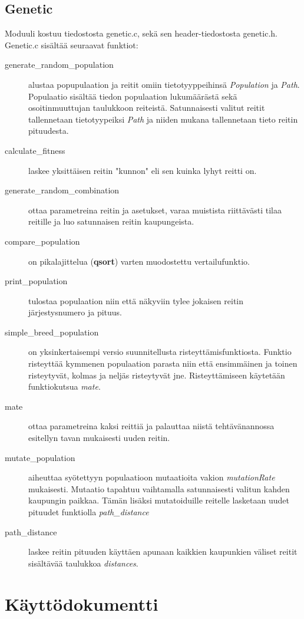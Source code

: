 \documentclass[12pt]{article}
\numberwithin{equation}{section}
\numberwithin{table}{section}
\begin{document}
\subsection{Genetic}
Moduuli kostuu tiedostosta genetic.c, sekä sen header-tiedostosta genetic.h. Genetic.c sisältää seuraavat funktiot:
\begin{description}
\item[generate\_random\_population] alustaa popupulaation ja reitit omiin tietotyyppeihinsä \emph{Population} ja \emph{Path}. Populaatio sisältää tiedon populaation lukumäärästä sekä osoitinmuuttujan taulukkoon reiteistä. Satunnaisesti valitut reitit tallennetaan tietotyypeiksi \emph{Path} ja niiden mukana tallennetaan tieto reitin pituudesta.
\item[calculate\_fitness] laskee yksittäisen reitin "kunnon" eli sen kuinka lyhyt reitti on.
\item[generate\_random\_combination] ottaa parametreina reitin ja asetukset, varaa muistista riittävästi tilaa reitille ja luo satunnaisen reitin kaupungeista.
\item[compare\_population] on pikalajittelua (\textbf{qsort}) varten muodostettu vertailufunktio.
\item[print\_population] tulostaa populaation niin että näkyviin tylee jokaisen reitin järjestysnumero ja pituus.
\item[simple\_breed\_population] on yksinkertaisempi versio suunnitellusta risteyttämisfunktiosta. Funktio risteyttää kymmenen populaation parasta niin että ensimmäinen ja toinen risteytyvät, kolmas ja neljäs risteytyvät jne. Risteyttämiseen käytetään funktiokutsua \emph{mate}.
\item[mate] ottaa parametreina kaksi reittiä ja palauttaa niistä tehtävänannossa esitellyn tavan mukaisesti uuden reitin.
\item[mutate\_population] aiheuttaa syötettyyn populaatioon mutaatioita vakion \emph{mutationRate} mukaisesti. Mutaatio tapahtuu vaihtamalla satunnaisesti valitun kahden kaupungin paikkaa. Tämän lisäksi mutatoiduille reitelle lasketaan uudet pituudet funktiolla \emph{path\_distance}
\item[path\_distance] laskee reitin pituuden käyttäen apunaan kaikkien kaupunkien väliset reitit sisältävää taulukkoa \emph{distances}.

\end{description}

\section{Käyttödokumentti}
\end{document}
